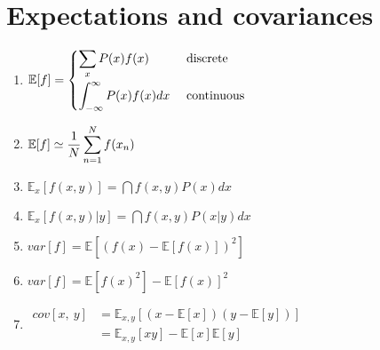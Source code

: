 \section{Expectations and covariances}

\begin{multicols}{2}
\begin{enumerate}[series=rvrules]
    \item
    $
        \mathbb{E}[f] =
        \begin{cases}
            \displaystyle\sum_x P(x)f(x) & \text{ discrete} \\[0.4cm]
            \displaystyle\int_{-\infty}^\infty P(x)f(x)dx & \text{ continuous} \\
        \end{cases}
    $
    \hfill \cite{ml/book/Pattern-Recognition-And-Machine-Learning/Christopher-M-Bishop}

    \item
    $
        \mathbb{E}[f] \simeq
        \dfrac{1}{N} \displaystyle\sum_{n=1}^N f(x_n)
    $
    \hfill \cite{ml/book/Pattern-Recognition-And-Machine-Learning/Christopher-M-Bishop}

    \item
    $
        \mathbb{E}_x[f(x, y)]
        = \dint f(x,y) P(x) dx
    $
    \hfill \cite{ml/book/Pattern-Recognition-And-Machine-Learning/Christopher-M-Bishop}

    \item
    $
        \mathbb{E}_x[f(x, y)|y]
        = \dint f(x,y) P(x|y) dx
    $
    \hfill \cite{ml/book/Pattern-Recognition-And-Machine-Learning/Christopher-M-Bishop}

    \item
    $
        var[f] = \mathbb{E}[(f(x) - \mathbb{E}[f(x)])^2]
    $
    \hfill \cite{ml/book/Pattern-Recognition-And-Machine-Learning/Christopher-M-Bishop}

    \item
    $
        var[f] = \mathbb{E}[f(x)^2] - \mathbb{E}[f(x)]^2
    $
    \hfill \cite{ml/book/Pattern-Recognition-And-Machine-Learning/Christopher-M-Bishop}

    \item
    $
        \begin{aligned}
            cov[x,\ y]
                & = \mathbb{E}_{x,y} [(x - \mathbb{E}[x]) (y - \mathbb{E}[y])] \\
                & = \mathbb{E}_{x,y} [xy] - \mathbb{E}[x]\mathbb{E}[y]
        \end{aligned}
    $
    \hfill \cite{ml/book/Pattern-Recognition-And-Machine-Learning/Christopher-M-Bishop}


\end{enumerate}
\end{multicols}
